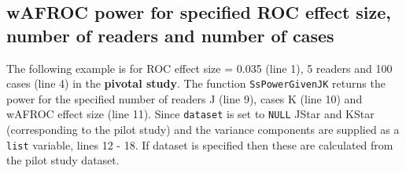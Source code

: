 \documentclass[
]{book}
\newenvironment{Shaded}{\begin{snugshade}}{\end{snugshade}}
\newcommand{\AttributeTok}[1]{\textcolor[rgb]{0.77,0.63,0.00}{#1}}
\newcommand{\CommentTok}[1]{\textcolor[rgb]{0.56,0.35,0.01}{\textit{#1}}}
\newcommand{\ConstantTok}[1]{\textcolor[rgb]{0.00,0.00,0.00}{#1}}
\newcommand{\DecValTok}[1]{\textcolor[rgb]{0.00,0.00,0.81}{#1}}
\newcommand{\FloatTok}[1]{\textcolor[rgb]{0.00,0.00,0.81}{#1}}
\newcommand{\FunctionTok}[1]{\textcolor[rgb]{0.00,0.00,0.00}{#1}}
\newcommand{\NormalTok}[1]{#1}
\newcommand{\OtherTok}[1]{\textcolor[rgb]{0.56,0.35,0.01}{#1}}
\newcommand{\SpecialCharTok}[1]{\textcolor[rgb]{0.00,0.00,0.00}{#1}}
\newcommand{\StringTok}[1]{\textcolor[rgb]{0.31,0.60,0.02}{#1}}
\begin{document}
\hypertarget{wafroc-power-for-specified-roc-effect-size-number-of-readers-and-number-of-cases}{%
\subsection{wAFROC power for specified ROC effect size, number of readers and number of cases}\label{wafroc-power-for-specified-roc-effect-size-number-of-readers-and-number-of-cases}}

The following example is for ROC effect size = 0.035 (line 1), 5 readers and 100 cases (line 4) in the \textbf{pivotal study}. The function \texttt{SsPowerGivenJK} returns the power for the specified number of readers J (line 9), cases K (line 10) and wAFROC effect size (line 11). Since \texttt{dataset} is set to \texttt{NULL} JStar and KStar (corresponding to the pilot study) and the variance components are supplied as a \texttt{list} variable, lines 12 - 18. If dataset is specified then these are calculated from the pilot study dataset.

\begin{Shaded}
\end{Shaded}
\end{document}
